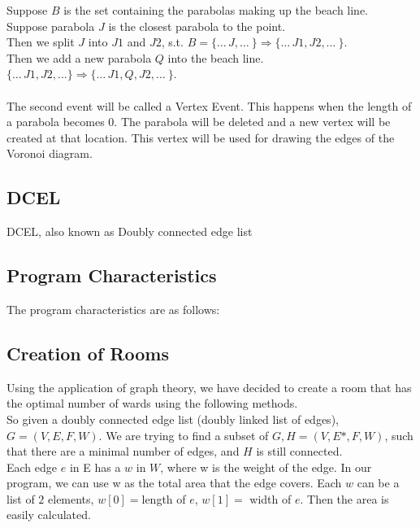 \documentclass{article}
\begin{document}
	\newline
	\indent Suppose \( B\) is the set containing the parabolas making up the beach line. \\
	\indent Suppose parabola \( J\) is the closest parabola to the point.\\
	\indent Then we split \( J\) into \( J1\) and \( J2\), s.t. 
\begin{math}B = \{\ldots\, J, \ldots\ \} \Longrightarrow \{\ldots\, J1, J2, \ldots\ \} \end{math}.\\
    \indent Then we add a new parabola \( Q\) into the beach line.
\begin{math}\{\ldots\, J1,  J2,\ldots\}\Longrightarrow \{\ldots\,  J1,  Q, J2, \ldots\ \}\end{math}.\\\\The second event will be called a Vertex Event. This happens when the length of a parabola becomes 0. The parabola will be deleted and a new vertex will be created at that location. This vertex will be used for drawing the edges of the Voronoi diagram.

\subsection{DCEL}
DCEL, also known as Doubly connected edge list

\subsection{Program Characteristics}
The program characteristics are as follows:\\

\subsection{Creation of Rooms}
Using the application of graph theory, we have decided to create a room that has the optimal number of wards using the following methods.\\
\newline
So given a doubly connected edge list (doubly linked list of edges), \begin{math}{G = (V, E, F, W)}\end{math}. We are trying to find a subset of \begin{math}{G, H = (V, E*, F, W)}\end{math}, such that there are a minimal number of edges, and \(H\) is still connected. \\
\newline
Each edge \(e\) in E has a \(w\) in \(W\), where w is the weight of the edge. In our program, we can use w as the total area that the edge covers. Each \(w\) can be a list of \(2\) elements, \begin{math}{ w[0] = }\end{math}length of \(e\),  \begin{math}{w[1] =}\end{math} width of \(e\). Then the area is easily calculated. 
\end{document}
